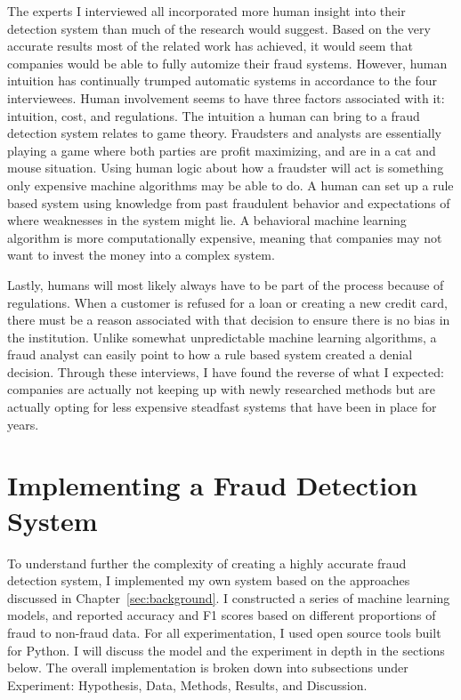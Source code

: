 \documentclass[midd]{thesis}
\begin{document}
The experts I interviewed all incorporated more human insight into their detection system than much of the research would suggest. Based on the very accurate results most of the related work has achieved, it would seem that companies would be able to fully automize their fraud systems. However, human intuition has continually trumped automatic systems in accordance to the four interviewees. Human involvement seems to have three factors associated with it: intuition, cost, and regulations. The intuition a human can bring to a fraud detection system relates to game theory. Fraudsters and analysts are essentially playing a game where both parties are profit maximizing, and are in a cat and mouse situation. Using human logic about how a fraudster will act is something only expensive machine algorithms may be able to do. A human can set up a rule based system using knowledge from past fraudulent behavior and expectations of where weaknesses in the system might lie. A behavioral machine learning algorithm is more computationally expensive, meaning that companies may not want to invest the money into a complex system. 

Lastly, humans will most likely always have to be part of the process because of regulations. When a customer is refused for a loan or creating a new credit card, there must be a reason associated with that decision to ensure there is no bias in the institution. Unlike somewhat unpredictable machine learning algorithms, a fraud analyst can easily point to how a rule based system created a denial decision. Through these interviews, I have found the reverse of what I expected: companies are actually not keeping up with newly researched methods but are actually opting for less expensive steadfast systems that have been in place for years. 


\pagebreak
\chapter{Implementing a Fraud Detection System}
\label{sec:impl}



To understand further the complexity of creating a highly accurate fraud detection system, I implemented my own system based on the approaches discussed in Chapter~\ref{sec:background}. I constructed a series of machine learning models, and reported accuracy and F1 scores based on different proportions of fraud to non-fraud data. For all experimentation, I used open source tools built for Python. I will discuss the model and the experiment in depth in the sections below. The overall implementation is broken down into subsections under Experiment: Hypothesis, Data, Methods, Results, and Discussion. 
\end{document}
